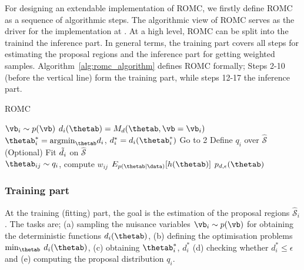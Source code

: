 For designing an extendable implementation of ROMC, we firstly define
ROMC as a sequence of algorithmic steps. The algorithmic view of ROMC
serves as the driver for the implementation at . At a high
level, ROMC can be split into the trainind the inference part. In
general terms, the training part covers all steps for estimating the
proposal regions and the inference part for getting weighted
samples. Algorithm~\ref{alg:romc_algorithm} defines ROMC formally;
Steps 2-10 (before the vertical line) form the training part, while
steps 12-17 the inference part.

\begin{algorithm}[!ht]
	\caption{ROMC}\label{alg:romc_algorithm}
	\begin{algorithmic}[1]
      \State $\vb_i \sim p(\vb)$ 
      \State $d_i(\thetab) = M_d(\thetab, \vb=\vb_i)$ 
      \State $\thetab_i^* = \text{argmin}_{\thetab} d_i$, $d_i^*=d_i(\thetab_i^*)$ 
        \State Go to 2 
      \EndIf
      \State Define $q_i$ over $\mathcal{\hat{S}}$ 
      \State (Optional) Fit $\Tilde{d}_i$ on $\mathcal{\hat{S}}$ 
      \\\hrulefill
        \State $\thetab_{ij} \sim q_i$, compute $w_{ij}$ 
      \EndFor
    \EndFor
    \State $E_{p(\thetab|\data)}[h(\thetab)]$ 
    \State $p_{d,\epsilon}(\thetab)$ 
    \EndProcedure
	\end{algorithmic}
\end{algorithm}

\subsubsection*{Training part}
\noindent
At the training (fitting) part, the goal is the estimation of the
proposal regions $\mathcal{\hat{S}}_i$. The tasks are; (a) sampling
the nuisance variables $\vb_i \sim p(\vb)$ for obtaining the
deterministic functions $d_i(\thetab)$, (b) defining the optimisation
problems $\min_{\thetab} \: d_i(\thetab)$, (c) obtaining
$\thetab_i^*$, $d_i^*$ (d) checking whether $d_i^* \leq \epsilon$ and
(e) computing the proposal distribution $q_i$.

